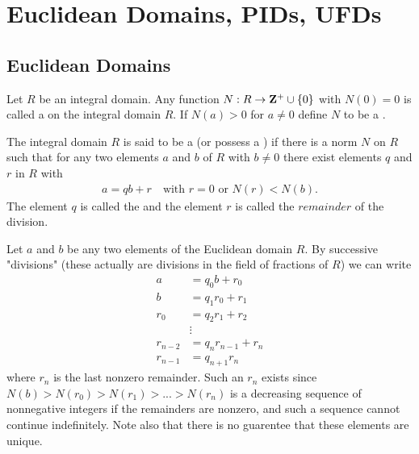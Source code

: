 \chapter{Euclidean Domains, PIDs, UFDs}\label{chapter:introduction}


\section{Euclidean Domains}
    \begin{definition}
        Let $R$ be an integral domain. Any function $N:R \rightarrow \mathbf{Z}^+ \cup \{0\}$ with $N(0)=0$ is called a  on the integral domain $R$. If $N(a) > 0$ for $a \neq 0$ define $N$ to be a .
    \end{definition}

    \begin{definition}
        The integral domain $R$ is said to be a  (or possess a ) if there is a norm $N$ on $R$ such that for any two elements $a$ and $b$ of $R$ with $b \neq 0$  there exist elements $q$ and $r$ in $R$ with 
            \begin{equation*}
            \begin{split}
                a = qb + r \quad \text{with} \hspace{4pt} r=0 \hspace{4pt} \text{or} \hspace{4pt} N(r) < N(b).
            \end{split}
            \end{equation*}
        The element $q$ is called the  and the element $r$ is called the $remainder$ of the division. 
    \end{definition}

    \begin{example}\label{example:euclidean-algorithm}
        Let $a$ and $b$ be any two elements of the Euclidean domain $R$. By successive "divisions" (these actually are divisions in the field of fractions of $R$) we can write
            \begin{equation*}
            \begin{split}
                a &= q_0 b + r_0 \\
                b &= q_1 r_0 + r_1 \\
                r_0 &= q_2 r_1 + r_2 \\
                & \vdots \\
                r_{n-2} &= q_{n} r_{n-1} + r_{n} \\
                r_{n-1} & = q_{n+1} r_{n}
            \end{split}
            \end{equation*}
        where $r_n$ is the last nonzero remainder. Such an $r_n$ exists since $N(b) > N(r_0) > N(r_1) > ... > N(r_n)$ is a decreasing sequence of nonnegative integers if the remainders are nonzero, and such a sequence cannot continue indefinitely. Note also that there is no guarentee that these elements are unique.
    \end{example}

